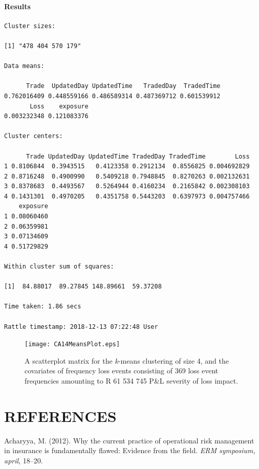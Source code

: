 \documentclass{DissertateUSU}
\begin{document}
\subsubsection{Results}
\begin{verbatim}
Cluster sizes:

[1] "478 404 570 179"

Data means:

      Trade  UpdatedDay UpdatedTime   TradedDay  TradedTime 
0.762016409 0.448559166 0.486589314 0.487369712 0.601539912 
       Loss    exposure 
0.003232348 0.121083376 

Cluster centers:

      Trade UpdatedDay UpdatedTime TradedDay TradedTime        Loss
1 0.8106844  0.3943515   0.4123358 0.2912134  0.8556825 0.004692829
2 0.8716248  0.4900990   0.5409218 0.7948845  0.8270263 0.002132631
3 0.8378683  0.4493567   0.5264944 0.4160234  0.2165842 0.002308103
4 0.1431301  0.4970205   0.4351758 0.5443203  0.6397973 0.004757466
    exposure
1 0.08060460
2 0.06359981
3 0.07134609
4 0.51729829

Within cluster sum of squares:

[1]  84.88017  89.27845 148.89661  59.37208

Time taken: 1.86 secs

Rattle timestamp: 2018-12-13 07:22:48 User
\end{verbatim}

\begin{figure}
\centering
\texttt{[image: CA14MeansPlot.eps]}
\caption{A scatterplot matrix for the \emph{k}-means clustering of size 4, and the covariates of frequency loss events consisting of 369 loss event frequencies amounting to R 61 534 745 P\&L severity of loss impact.}
\label{CA14MeansPlot}
\end{figure}

\singlespacing

\FloatBarrier
\newpage
{}
\fancyhead[R]{\thepage}
\fancyfoot[C]{}

\chapter*{REFERENCES}

\setlength{\parindent}{-0.5in}
\setlength{\leftskip}{0.4in}
\setlength{\parskip}{6pt}

\noindent

\hypertarget{refs}{}
\leavevmode\hypertarget{ref-acharyya2012current}{}%
Acharyya, M. (2012). Why the current practice of operational risk
management in insurance is fundamentally flawed: Evidence from the
field. \emph{ERM symposium, april}, 18--20.
\end{document}
